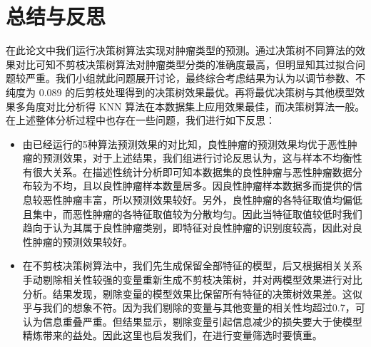 \documentclass[a4paper,12pt,onecolumn,oneside]{article}
\begin{document}
\section{总结与反思}
	在此论文中我们运行决策树算法实现对肿瘤类型的预测。通过决策树不同算法的效果对比可知不剪枝决策树算法对肿瘤类型分类的准确度最高，但明显知其过拟合问题较严重。我们小组就此问题展开讨论，最终综合考虑结果为认为以调节参数、不纯度为 0.089 的后剪枝处理得到的决策树效果最优。再将最优决策树与其他模型效果多角度对比分析得 KNN 算法在本数据集上应用效果最佳，而决策树算法一般。在上述整体分析过程中也存在一些问题，我们进行如下反思：
	
	\begin{itemize}
		\item 由已经运行的5种算法预测效果的对比知，良性肿瘤的预测效果均优于恶性肿瘤的预测效果，对于上述结果，我们组进行讨论反思认为，这与样本不均衡性有很大关系。在描述性统计分析即可知本数据集的良性肿瘤与恶性肿瘤数据分布较为不均，且以良性肿瘤样本数量居多。因良性肿瘤样本数据多而提供的信息较恶性肿瘤丰富，所以预测效果较好。另外，良性肿瘤的各特征取值均偏低且集中，而恶性肿瘤的各特征取值较为分散均匀。因此当特征取值较低时我们趋向于认为其属于良性肿瘤类别，即特征对良性肿瘤的识别度较高，因此对良性肿瘤的预测效果较好。
		\item 在不剪枝决策树算法中，我们先生成保留全部特征的模型，后又根据相关关系手动剔除相关性较强的变量重新生成不剪枝决策树，并对两模型效果进行对比分析。结果发现，剔除变量的模型效果比保留所有特征的决策树效果差。这似乎与我们的想象不符。因为我们剔除的变量与其他变量的相关性均超过0.7，可认为信息重叠严重。但结果显示，剔除变量引起信息减少的损失要大于使模型精炼带来的益处。因此这里也启发我们，在进行变量筛选时要慎重。
	\end{itemize}
	
\end{document}
